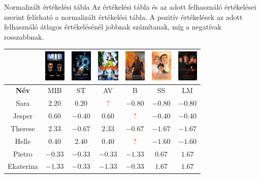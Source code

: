 \documentclass[english, aspectratio=169]{beamer}
\begin{document}
\begin{frame}{Normalizált értékelési tábla}
Az értékelési tábla és az adott felhasználó értékelései szerint felírható a normalizált értékelési tábla. A pozitív értékelések az adott felhasználó átlagos értékelésénél jobbnak számítanak, míg a negatívak rosszabbnak. 
\begin{center}
\begin{tabular}{|c|c|c|c|c|c|c|}
\hline
& 
\includegraphics[height=1.5cm, keepaspectratio]{images/movies/men_in_black.png} &
\includegraphics[height=1.5cm, keepaspectratio]{images/movies/star_trek.png} &
\includegraphics[height=1.5cm, keepaspectratio]{images/movies/ace_ventura.png} &
\includegraphics[height=1.5cm, keepaspectratio]{images/movies/braveheart.png} &
\includegraphics[height=1.5cm, keepaspectratio]{images/movies/sense_and_sensibility.png} &
\includegraphics[height=1.5cm, keepaspectratio]{images/movies/les_miserables.png} \\
\hline
\textbf{Név} & MIB & ST & AV & B & SS & LM\\ 
\hline
Sara & $2.20$ & $0.20$ & \textcolor{red}{$?$} & $-0.80$ & $-0.80$ & $-0.80$ \\
\hline
Jesper & $0.60$ & $-0.40$ & $0.60$ & \textcolor{red}{$?$} & $-0.40$ & $-0.40$ \\
\hline
Therese & $2.33$ & $-0.67$ & $2.33$ & $-0.67$ & $-1.67$ & $-1.67$ \\
\hline
Helle & $0.40$ & $2.40$ & $0.40$ & \textcolor{red}{$?$} & $-1.60$ & $-1.60$ \\
\hline
Pietro & $-0.33$ & $-0.33$ & $-0.33$ & $-1.33$ & $0.67$ & $1.67$ \\
\hline
Ekaterina & $-1.33$ & $-0.33$ & $-1.33$ & $-0.33$ & $1.67$ & $1.67$ \\
\hline
\end{tabular}
\end{center}
\end{frame}
\end{document}
